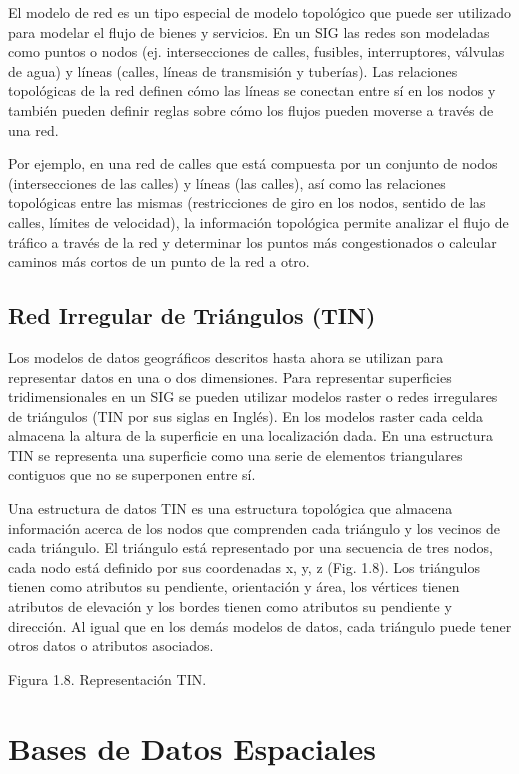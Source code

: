 El modelo de red es un tipo especial de modelo topológico que puede ser utilizado para modelar el flujo de bienes y servicios. En un SIG las redes son modeladas como puntos o nodos (ej. intersecciones de calles, fusibles, interruptores, válvulas de agua) y líneas  (calles, líneas de transmisión y tuberías).  Las relaciones topológicas de la red definen  cómo las líneas se conectan entre sí en los nodos y también pueden definir reglas sobre cómo los flujos pueden moverse a través de una red.

Por ejemplo, en una red de calles que está compuesta por un conjunto de nodos (intersecciones de las calles) y líneas (las calles), así como las relaciones topológicas entre las mismas (restricciones de giro en los nodos, sentido de las calles, límites de velocidad), la información topológica permite analizar el flujo de tráfico a través de la red y determinar los puntos más congestionados o calcular caminos más cortos de un punto de la red a otro.

\subsection{Red Irregular de Triángulos (TIN)}

Los modelos de datos geográficos descritos hasta ahora se utilizan para representar datos en una o dos dimensiones. Para representar superficies tridimensionales en un SIG se pueden utilizar modelos raster o redes irregulares de triángulos (TIN por sus siglas en Inglés). En los modelos raster cada celda almacena la altura de la superficie en una localización dada. En una estructura TIN se representa una superficie como una serie de elementos triangulares contiguos que no se superponen entre sí.

Una estructura de datos TIN es una estructura topológica que almacena información acerca de los nodos que comprenden cada triángulo y los vecinos de cada triángulo. El triángulo está representado por una secuencia de tres nodos, cada nodo está definido por sus coordenadas x, y, z (Fig. 1.8). Los triángulos tienen como atributos su pendiente, orientación y área, los vértices tienen atributos de elevación y los bordes tienen como atributos su pendiente y dirección. Al igual que en los demás modelos de datos, cada triángulo puede tener otros datos o atributos asociados.

Figura 1.8. Representación TIN.

\section{Bases de Datos Espaciales}

